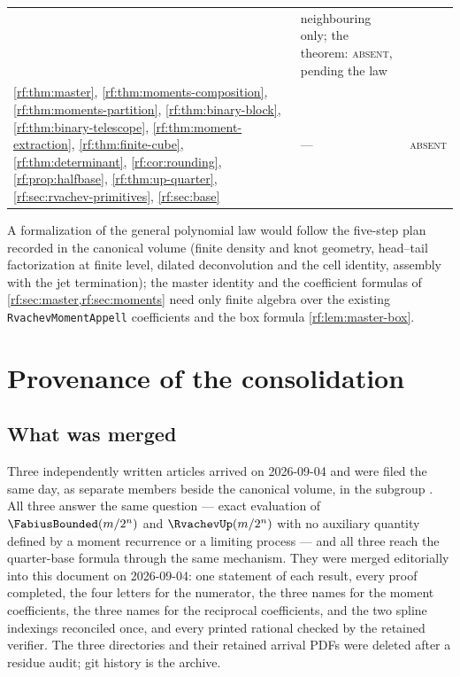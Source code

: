 \documentclass[11pt,oneside]{article}
\theoremstyle{plain}
\theoremstyle{definition}
\theoremstyle{remark}
\newcommand{\Fb}{\FabiusBounded}            %
\newcommand{\up}{\RvachevUp}                %
\begin{document}
\begin{center}
\begin{longtable}{@{}>{\raggedright\arraybackslash}p{}>{\raggedright\arraybackslash}p{}>{\raggedright\arraybackslash}p{}@{}}
& neighbouring only; the theorem: \textsc{absent}, pending the law\\[0.3em]
\cref{rf:thm:master}, \cref{rf:thm:moments-composition}, \cref{rf:thm:moments-partition}, \cref{rf:thm:binary-block}, \cref{rf:thm:binary-telescope}, \cref{rf:thm:moment-extraction}, \cref{rf:thm:finite-cube}, \cref{rf:thm:determinant}, \cref{rf:cor:rounding}, \cref{rf:prop:halfbase}, \cref{rf:thm:up-quarter}, \cref{rf:sec:rvachev-primitives}, \cref{rf:sec:base}
& --- & \textsc{absent}\\
\bottomrule
\end{longtable}
\end{center}

A formalization of the general polynomial law would follow the five-step
plan recorded in the canonical volume (finite density and knot geometry,
head--tail factorization at finite level, dilated deconvolution and the
cell identity, assembly with the jet termination); the master identity and
the coefficient formulas of \cref{rf:sec:master,rf:sec:moments} need only
finite algebra over the existing \texttt{RvachevMomentAppell} coefficients
and the box formula \cref{rf:lem:master-box}.

\section{Provenance of the consolidation}
\label{rf:sec:provenance}

\subsection{What was merged}

Three independently written articles arrived on 2026-09-04 and were filed
the same day, as separate members beside the canonical volume, in the
subgroup .  All three
answer the same question --- exact evaluation of $\Fb(m/2^{n})$ and
$\up(m/2^{n})$ with no auxiliary quantity defined by a moment recurrence or
a limiting process --- and all three reach the quarter-base formula through
the same mechanism.  They were merged editorially into this document on
2026-09-04: one statement of each result, every proof completed, the four
letters for the numerator, the three names for the moment coefficients, the
three names for the reciprocal coefficients, and the two spline indexings
reconciled once, and every printed rational checked by the retained
verifier.  The three directories and their retained arrival PDFs were
deleted after a residue audit; git history is the archive.
\end{document}
